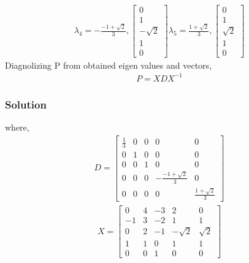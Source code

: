 \documentclass{beamer}
\begin{document}
\begin{frame}
\begin{align}
\lambda_{4} = 
- \frac{-1 + \sqrt{2}}{3}, \left[\begin{array}{c}0\\1\\- \sqrt{2}\\1\\0\end{array}\right]
\lambda_{5}= 
\frac{1 + \sqrt{2}}{3},\left[\begin{array}{c}0\\1\\\sqrt{2}\\1\\0\end{array}\right]
\end{align}
Diagnolizing P from obtained eigen values and vectors,
\begin{align}
    P = X D X^{-1}
\end{align}
\end{frame}

\begin{frame}
\frametitle{Solution}
where,
\begin{align}
    D = \left[\begin{array}{ccccc}\frac{1}{3} & 0 & 0 & 0 & 0\\0 & 1 & 0 & 0 & 0\\0 & 0 & 1 & 0 & 0\\0 & 0 & 0 & - \frac{-1 + \sqrt{2}}{3} & 0\\0 & 0 & 0 & 0 & \frac{1 + \sqrt{2}}{3}\end{array}\right]
\end{align}
\begin{align}
    X = \left[\begin{array}{ccccc}0 & 4 & -3 & 2 & 0\\-1 & 3 & -2 & 1 & 1\\0 & 2 & -1 & - \sqrt{2} & \sqrt{2}\\1 & 1 & 0 & 1 & 1\\0 & 0 & 1 & 0 & 0\end{array}\right]
\end{align}
\end{frame}
\end{document}
